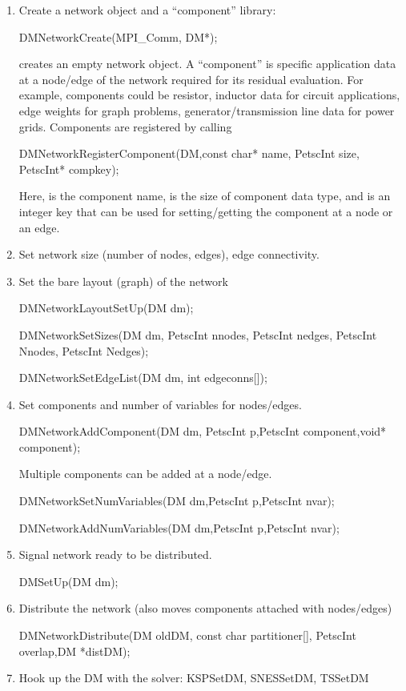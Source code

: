 {{\begin{enumerate}
  \item Create a network object and a ``component'' library:
  \begin{tabbing}
  DMNetworkCreate(MPI\_Comm, DM*);
  \end{tabbing}
  creates an empty network object. A ``component'' is specific application data at a node/edge of the network required for its residual evaluation. For example, components could be resistor, inductor data for circuit applications, edge weights for graph problems, generator/transmission line data for power grids. Components are registered by calling
  \begin{tabbing}
    DMNetworkRegisterComponent(DM,const char* name, PetscInt size, PetscInt* compkey);
  \end{tabbing}
  Here,  is the component name, is the size of component data type, and  is an integer key that can be used for
  setting/getting the component at a node or an edge.
  \item Set network size (number of nodes, edges), edge connectivity.
  \item Set the bare layout (graph) of the network
  \begin{tabbing}
    DMNetworkLayoutSetUp(DM dm);
  \end{tabbing}   
  \begin{tabbing}
    DMNetworkSetSizes(DM dm, PetscInt nnodes, PetscInt nedges, PetscInt Nnodes, PetscInt Nedges);
  \end{tabbing}
  \begin{tabbing}
    DMNetworkSetEdgeList(DM dm, int edgeconns[]);
  \end{tabbing}  
  \item Set components and number of variables for nodes/edges.
  \begin{tabbing}
    DMNetworkAddComponent(DM dm, PetscInt p,PetscInt component,void* component);
  \end{tabbing}
  Multiple components can be added at a node/edge.
  \begin{tabbing}
    DMNetworkSetNumVariables(DM dm,PetscInt p,PetscInt nvar);
  \end{tabbing}
  \begin{tabbing}
    DMNetworkAddNumVariables(DM dm,PetscInt p,PetscInt nvar);
   \end{tabbing}
  \item Signal network ready to be distributed.
  \begin{tabbing}
    DMSetUp(DM dm);
  \end{tabbing}
  \item Distribute the network (also moves components attached with nodes/edges)
  \begin{tabbing}
    DMNetworkDistribute(DM oldDM, const char partitioner[], PetscInt overlap,DM *distDM);
  \end{tabbing}  
  \item Hook up the DM with the solver: KSPSetDM, SNESSetDM, TSSetDM
\end{enumerate}

}}
